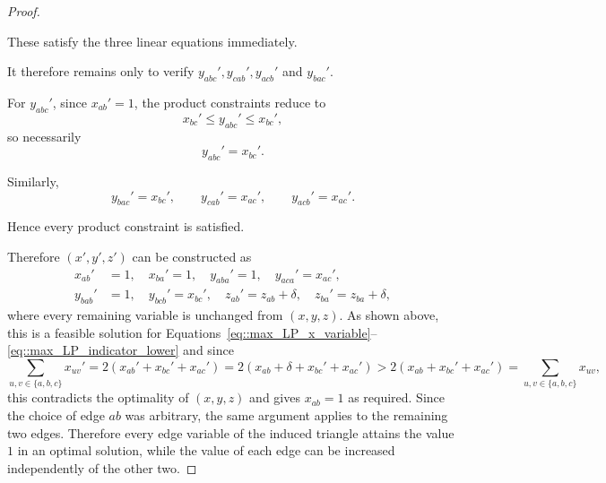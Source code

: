 \begin{proof}
\begin{enumerate}[label=\Alph*.]
      These satisfy the three linear equations immediately.

      It therefore remains only to verify
      $y_{abc}',y_{cab}',y_{acb}'$ and $y_{bac}'$.

      For $y_{abc}'$, since $x_{ab}'=1$, the product constraints reduce to
      \[
      x_{bc}'
      \le
      y_{abc}'
      \le
      x_{bc}',
      \]
      so necessarily
      \[
      y_{abc}'=x_{bc}'.
      \]

      Similarly,
      \[
      y_{bac}'=x_{bc}',
      \qquad
      y_{cab}'=x_{ac}',
      \qquad
      y_{acb}'=x_{ac}'.
      \]

      Hence every product constraint is satisfied.
  \end{enumerate}
  Therefore $(x',y',z')$ can be constructed as 
  \begin{align*}
  x_{ab}'&=1,\quad x_{ba}'=1,\quad y_{aba}'=1,\quad y_{aca}'=x_{ac}',\\
  y_{bab}'&=1,\quad y_{bcb}'=x_{bc}',\quad z_{ab}'=z_{ab}+\delta,\quad z_{ba}'=z_{ba}+\delta,
  \end{align*}
  where every remaining variable is unchanged from $(x,y,z)$. As shown above, this is a feasible solution for Equations~\eqref{eq::max_LP_x_variable}--\eqref{eq::max_LP_indicator_lower} and since
  \[
  \sum_{u,v\in\{a,b,c\}}x_{uv}' = 2(x_{ab}'+x_{bc}'+x_{ac}') = 2(x_{ab} + \delta + x_{bc}'+x_{ac}') > 2(x_{ab}+x_{bc}'+x_{ac}')  = \sum_{u,v\in\{a,b,c\}}x_{uv},
  \]
  this contradicts the optimality of $(x,y,z)$ and gives $x_{ab}=1$ as required. Since the choice of edge $ab$ was arbitrary, the same argument applies to the remaining two edges. Therefore every edge variable of the induced triangle attains the value $1$ in an optimal solution, while the value of each edge can be increased independently of the other two. 
\end{proof}

